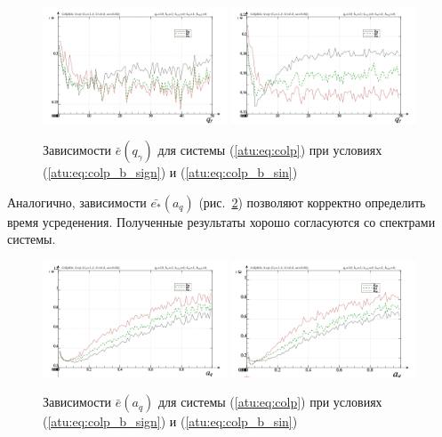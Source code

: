 \documentclass[a4paper,12pt]{article}
\begin{document}
\begin{figure}[htb!]
\centerline{
  \includegraphics[width=0.49\textwidth]{p/cha/colp/colp_m5p-p_qg_e_sign.png}
  \includegraphics[width=0.49\textwidth]{p/cha/colp/colp_m5p-p_qg_e_sin.png}
}
  \caption{Зависимости  $\bar{e}(q_\gamma)$ для системы (\ref{atu:eq:colp})
  при условиях (\ref{atu:eq:colp_b_sign}) и (\ref{atu:eq:colp_b_sin})
}
\label{atu:f:colp_e_qgamma}
\end{figure}



Аналогично, зависимости $\bar{e_*}(a_q)$ (рис.~\ref{atu:f:colp_e_a_q})
позволяют корректно определить время усреденения.
Полученные результаты хорошо согласуются со спектрами системы.

\begin{figure}[htb!]
\centerline{
  \includegraphics[width=0.49\textwidth]{p/cha/colp/colp_m5p-p_a_q_e_sign.png}
  \includegraphics[width=0.49\textwidth]{p/cha/colp/colp_m5p-p_a_q_e_sin.png}
}
  \caption{Зависимости  $\bar{e}(a_q)$ для системы (\ref{atu:eq:colp})
  при условиях (\ref{atu:eq:colp_b_sign}) и (\ref{atu:eq:colp_b_sin})
}
\label{atu:f:colp_e_a_q}
\end{figure}
\end{document}
